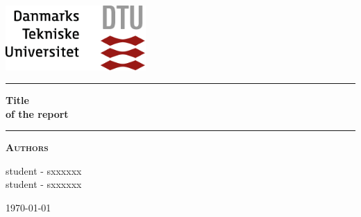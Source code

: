 
\begin{titlepage}
\begin{center}
\vspace{2cm}
\includegraphics[width=0.4\textwidth]{root/dtu.png}~\\[1cm]
\vspace{2cm}

\vspace{2cm}

\hrule
\vspace{.5cm}
{ \huge \bfseries Title\\ of the report} %
\vspace{.5cm}

\hrule
\vspace{1.5cm}

\textsc{\textbf{Authors}}\\
\vspace{.5cm}
\centering

student - sxxxxxx\\
student - sxxxxxx\\

\vspace{4cm}

\centering \today %
\end{center}
\end{titlepage}